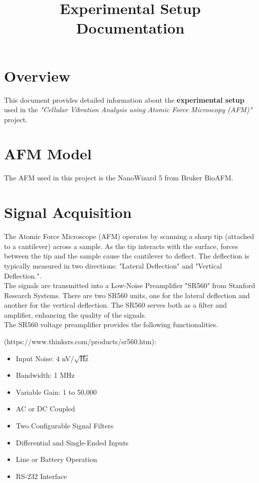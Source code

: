 \documentclass[a4paper, 12pt]{article}
\title{Experimental Setup Documentation}
\date{ }
\begin{document}
	
	\maketitle
	
	\section*{Overview}
	
	This document provides detailed information about the \textbf{experimental setup} used in the \textit{"Cellular Vibration Analysis using Atomic Force Microscopy (AFM)"} project.
	
	\section*{AFM Model}
	
	The AFM used in this project is the NanoWizard 5 from Bruker BioAFM.
	
	\section*{Signal Acquisition}
	
	The Atomic Force Microscope (AFM) operates by scanning a sharp tip (attached to a cantilever) across a sample. As the tip interacts with the surface, forces between the tip and the sample cause the cantilever to deflect. The deflection is typically measured in two directions: "Lateral Deflection" and "Vertical Deflection.".\\
	
	The signals are transmitted into a Low-Noise Preamplifier "SR560" from Stanford Research Systems. There are two SR560 units, one for the lateral deflection and another for the vertical deflection. The SR560 serves both as a filter and amplifier, enhancing the quality of the signals.\\
	
	The SR560 voltage preamplifier provides the following functionalities.
	
	(https://www.thinksrs.com/products/sr560.htm):
	
	\begin{itemize}
		\item Input Noise: 4 nV/$\sqrt{\text{Hz}}$
		\item Bandwidth: 1 MHz
		\item Variable Gain: 1 to 50,000
		\item AC or DC Coupled
		\item Two Configurable Signal Filters
		\item Differential and Single-Ended Inputs
		\item Line or Battery Operation
		\item RS-232 Interface
	\end{itemize}
	
\end{document}
